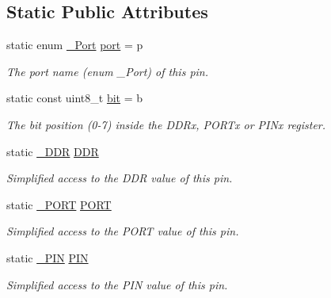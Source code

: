 \subsection*{Static Public Attributes}
\begin{DoxyCompactItemize}
\item 
static enum \hyperlink{namespaceports_a9949317f344930bd6ad1097e80c97b67}{\+\_\+\+Port} \hyperlink{structports_1_1Pin_ad63613b8c14441d28e3f3d935da67e77}{port} = p\hypertarget{structports_1_1Pin_ad63613b8c14441d28e3f3d935da67e77}{}\label{structports_1_1Pin_ad63613b8c14441d28e3f3d935da67e77}

\begin{DoxyCompactList}\small\item\em The port name (enum \+\_\+\+Port) of this pin. \end{DoxyCompactList}\item 
static const uint8\+\_\+t \hyperlink{structports_1_1Pin_aea726b85cfe5e49822dd2517da5c860f}{bit} = b\hypertarget{structports_1_1Pin_aea726b85cfe5e49822dd2517da5c860f}{}\label{structports_1_1Pin_aea726b85cfe5e49822dd2517da5c860f}

\begin{DoxyCompactList}\small\item\em The bit position (0-\/7) inside the D\+D\+Rx, P\+O\+R\+Tx or P\+I\+Nx register. \end{DoxyCompactList}\item 
static \hyperlink{structports_1_1__Io}{\+\_\+\+D\+DR} \hyperlink{structports_1_1Pin_aaebb4d6cb5db0635fe8e7d6e7d315c7f}{D\+DR}
\begin{DoxyCompactList}\small\item\em Simplified access to the D\+DR value of this pin. \end{DoxyCompactList}\item 
static \hyperlink{structports_1_1__Io}{\+\_\+\+P\+O\+RT} \hyperlink{structports_1_1Pin_aaa08f0eb17ef31d9f46d65d50c8a093e}{P\+O\+RT}
\begin{DoxyCompactList}\small\item\em Simplified access to the P\+O\+RT value of this pin. \end{DoxyCompactList}\item 
static \hyperlink{structports_1_1__Io}{\+\_\+\+P\+IN} \hyperlink{structports_1_1Pin_ae2e45a41082457c350f71f7a720265d4}{P\+IN}
\begin{DoxyCompactList}\small\item\em Simplified access to the P\+IN value of this pin. \end{DoxyCompactList}\end{DoxyCompactItemize}


